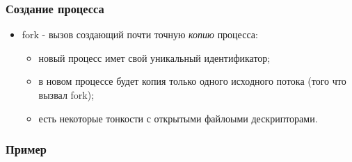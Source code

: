 \begin{frame}
\frametitle{Создание процесса}
\begin{itemize}
  \item fork - вызов создающий почти точную \emph{копию} процесса:
  \begin{itemize}
    \item новый процесс имет свой уникальный идентификатор;
    \item в новом процессе будет копия только одного исходного потока (того что
    вызвал fork);
    \item есть некоторые тонкости с открытыми файлоыми дескрипторами.
  \end{itemize}
\end{itemize}
\end{frame}

\begin{frame}[fragile]
\frametitle{Пример}

\end{frame}
